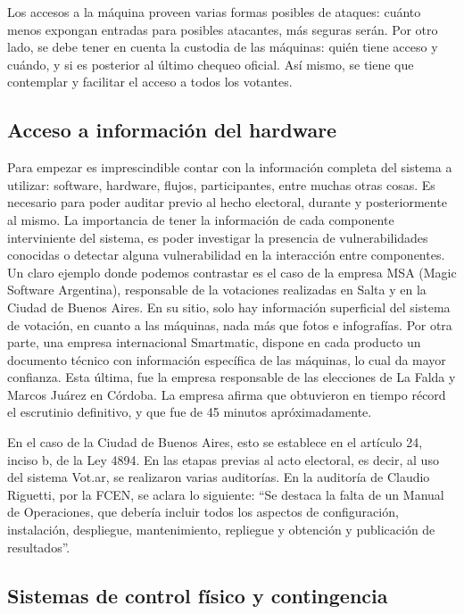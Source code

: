 Los accesos a la máquina proveen varias formas posibles de ataques: cuánto menos expongan entradas para posibles atacantes, más seguras serán. Por otro lado, se debe tener en cuenta la custodia de las máquinas: quién tiene acceso y cuándo, y si es posterior al último chequeo oficial. Así mismo, se tiene que contemplar y facilitar el acceso a todos los votantes.

\subsection{Acceso a información del hardware}

Para empezar es imprescindible contar con la información completa del sistema a utilizar: software, hardware, flujos, participantes, entre muchas otras cosas. Es necesario para poder auditar previo al hecho electoral, durante y posteriormente al mismo. La importancia de tener la información de cada componente interviniente del sistema, es poder investigar la presencia de vulnerabilidades conocidas o detectar alguna vulnerabilidad en la interacción entre componentes. Un claro ejemplo donde podemos contrastar es el caso de la empresa MSA (Magic Software Argentina), responsable de la votaciones realizadas en Salta y en la Ciudad de Buenos Aires. En su sitio, solo hay información superficial del sistema de votación, en cuanto a las máquinas, nada más que fotos e infografías. Por otra parte, una empresa internacional Smartmatic, dispone en cada producto un documento técnico con información específica de las máquinas\cite{smartmatic}, lo cual da mayor confianza. Esta última, fue la empresa responsable de las elecciones de La Falda y Marcos Juárez en Córdoba. La empresa afirma que obtuvieron en tiempo récord el escrutinio definitivo, y que fue de 45 minutos apróximadamente\cite{smartmatic:cordoba}.

En el caso de la Ciudad de Buenos Aires, esto se establece en el artículo 24, inciso b, de la Ley 4894. En las etapas previas al acto electoral, es decir, al uso del sistema Vot.ar, se realizaron varias auditorías.
En la auditoría de Claudio Riguetti, por la FCEN, se aclara lo siguiente: “Se destaca la falta de un Manual de Operaciones, que debería incluir todos los aspectos de configuración, instalación, despliegue, mantenimiento, repliegue y obtención y publicación de resultados”\cite{righetti}.

\subsection{Sistemas de control físico y contingencia}

